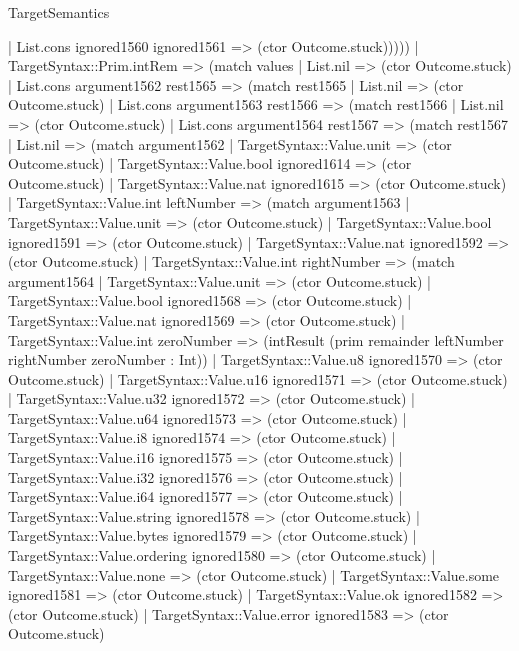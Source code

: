\begin{lexlean}{TargetSemantics}
\begin{semanticmodule}
{            | List.cons ignored1560 ignored1561 => (ctor Outcome.stuck)))))
    | TargetSyntax::Prim.intRem => (match values
      | List.nil => (ctor Outcome.stuck)
      | List.cons argument1562 rest1565 => (match rest1565
        | List.nil => (ctor Outcome.stuck)
        | List.cons argument1563 rest1566 => (match rest1566
          | List.nil => (ctor Outcome.stuck)
          | List.cons argument1564 rest1567 => (match rest1567
            | List.nil => (match argument1562
              | TargetSyntax::Value.unit => (ctor Outcome.stuck)
              | TargetSyntax::Value.bool ignored1614 => (ctor Outcome.stuck)
              | TargetSyntax::Value.nat ignored1615 => (ctor Outcome.stuck)
              | TargetSyntax::Value.int leftNumber => (match argument1563
                | TargetSyntax::Value.unit => (ctor Outcome.stuck)
                | TargetSyntax::Value.bool ignored1591 => (ctor Outcome.stuck)
                | TargetSyntax::Value.nat ignored1592 => (ctor Outcome.stuck)
                | TargetSyntax::Value.int rightNumber => (match argument1564
                  | TargetSyntax::Value.unit => (ctor Outcome.stuck)
                  | TargetSyntax::Value.bool ignored1568 => (ctor Outcome.stuck)
                  | TargetSyntax::Value.nat ignored1569 => (ctor Outcome.stuck)
                  | TargetSyntax::Value.int zeroNumber => (intResult (prim remainder leftNumber rightNumber zeroNumber : Int))
                  | TargetSyntax::Value.u8 ignored1570 => (ctor Outcome.stuck)
                  | TargetSyntax::Value.u16 ignored1571 => (ctor Outcome.stuck)
                  | TargetSyntax::Value.u32 ignored1572 => (ctor Outcome.stuck)
                  | TargetSyntax::Value.u64 ignored1573 => (ctor Outcome.stuck)
                  | TargetSyntax::Value.i8 ignored1574 => (ctor Outcome.stuck)
                  | TargetSyntax::Value.i16 ignored1575 => (ctor Outcome.stuck)
                  | TargetSyntax::Value.i32 ignored1576 => (ctor Outcome.stuck)
                  | TargetSyntax::Value.i64 ignored1577 => (ctor Outcome.stuck)
                  | TargetSyntax::Value.string ignored1578 => (ctor Outcome.stuck)
                  | TargetSyntax::Value.bytes ignored1579 => (ctor Outcome.stuck)
                  | TargetSyntax::Value.ordering ignored1580 => (ctor Outcome.stuck)
                  | TargetSyntax::Value.none => (ctor Outcome.stuck)
                  | TargetSyntax::Value.some ignored1581 => (ctor Outcome.stuck)
                  | TargetSyntax::Value.ok ignored1582 => (ctor Outcome.stuck)
                  | TargetSyntax::Value.error ignored1583 => (ctor Outcome.stuck)
}
\end{semanticmodule}
\end{lexlean}
